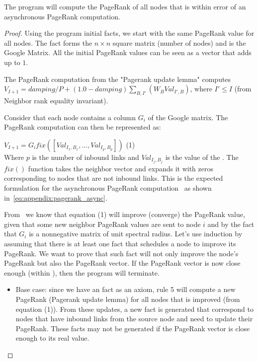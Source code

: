 \begin{theorem}
The program will compute the PageRank of all nodes that is within  error
of an asynchronous PageRank computation.
\end{theorem}
\begin{proof}

Using the program initial facts, we start with the same PageRank value for all
nodes.  The  fact forms the $n \times n$ square
matrix (number of nodes) and is the Google Matrix.  All the initial PageRank
values can be seen as a vector that adds up to $1$.

The PageRank computation from the "Pagerank update lemma" computes $V_{I + 1} =
damping / P + (1.0 - damping)\sum_{B, I'} (W_{B} Val_{I',B})$, where $I'
\leq I$ (from Neighbor rank equality invariant).

Consider that each node contains a column $G_i$ of the Google matrix. The
PageRank computation can then be represented as: \newline


$V_{I + 1} = G_i fix([Val_{I_1, B_1}, ..., Val_{I_p, B_p}])$ \hfill (1) \\


Where $p$ is the number of inbound links and $Val_{I_j, B_j}$ is the value of the
. The $fix()$ function
takes the neighbor vector and expands it with zeros corresponding to nodes that
are not inbound links. This is the expected formulation for the asynchronous
PageRank computation~\cite{DBLP:journals/corr/abs-cs-0606047} as shown
in~\ref{eq:appendix:pagerank_async}.

From~\cite{DBLP:journals/corr/abs-cs-0606047, Lubachevsky:1986:CAA:4904.4801} we
know that equation (1) will improve (converge) the PageRank value, given that
some new neighbor PageRank values are sent to node $i$ and by the fact that
$G_i$ is a nonnegative matrix of unit spectral radius. Let's use induction by
assuming that there is at least one  fact that schedules a node to
improve its PageRank. We want to prove that such fact will not only improve the
node's PageRank but also the PageRank vector.  If the PageRank vector is now
close enough (within ), then the program will terminate.

\begin{itemize}

   \item Base case: since we have an  fact as an axiom, rule 5 will
      compute a new PageRank (Pagerank update lemma) for all nodes that is
      improved (from equation (1)). From these updates, a new  fact
      is generated that correspond to nodes that have inbound links from the
      source node and need to update their PageRank. These  facts
      may not be generated if the PageRank vector is close enough to its real
      value.


\end{itemize}
\end{proof}
